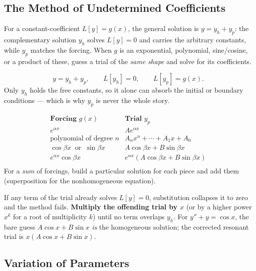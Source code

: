 \subsection{The Method of Undetermined Coefficients}

For a constant-coefficient $L[y] = g(x)$, the general solution is
$y = y_h + y_p$: the complementary solution $y_h$ solves $L[y]=0$ and carries the
arbitrary constants, while $y_p$ matches the forcing. When $g$ is an exponential,
polynomial, sine/cosine, or a product of these, guess a trial of the \emph{same
shape} and solve for its coefficients.

\begin{formulabox}
\[ y = y_h + y_p, \qquad L[y_h] = 0, \qquad L[y_p] = g(x). \]
Only $y_h$ holds the free constants, so it alone can absorb the initial or
boundary conditions --- which is why $y_p$ is never the whole story.
\end{formulabox}

\begin{formulabox}
\[
\begin{array}{l|l}
\textbf{Forcing } g(x) & \textbf{Trial } y_p \\ \hline
e^{\alpha x} & A e^{\alpha x} \\
\text{polynomial of degree } n & A_n x^n + \cdots + A_1 x + A_0 \\
\cos\beta x \ \text{ or } \ \sin\beta x & A\cos\beta x + B\sin\beta x \\
e^{\alpha x}\cos\beta x & e^{\alpha x}(A\cos\beta x + B\sin\beta x) \\
\end{array}
\]
For a \emph{sum} of forcings, build a particular solution for each piece and add
them (superposition for the nonhomogeneous equation).
\end{formulabox}

\begin{warningbox}
If any term of the trial already solves $L[y]=0$, substitution collapses it to
zero and the method fails. \textbf{Multiply the offending trial by $x$} (or by a
higher power $x^k$ for a root of multiplicity $k$) until no term overlaps $y_h$.
For $y''+y=\cos x$, the bare guess $A\cos x + B\sin x$ \emph{is} the homogeneous
solution; the corrected resonant trial is $x(A\cos x + B\sin x)$.
\end{warningbox}

\subsection{Variation of Parameters}

